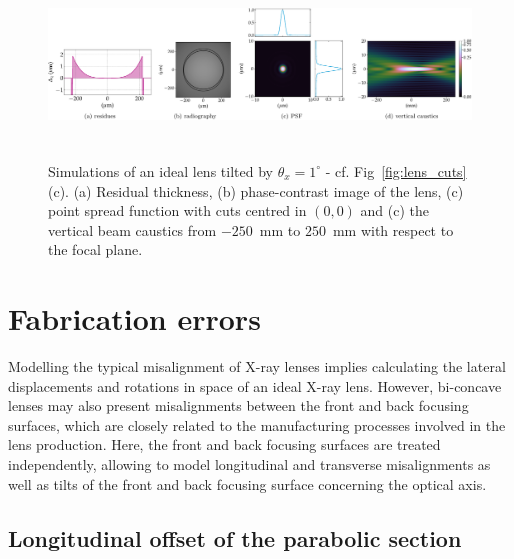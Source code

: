 \begin{refsection}
\begin{figure}[t]
        \centering
        {\includegraphics[height=4.19cm]{figures/compressed/tilted_CRL.pdf}}
        \caption[Effects of a CRL tilt]{Simulations of an ideal lens tilted by $\theta_x=1^{\circ}$ - cf. Fig~\ref{fig:lens_cuts}(c). (a) Residual thickness, (b) phase-contrast image of the lens, (c) point spread function with cuts centred in $(0,0)$ and (c) the vertical beam caustics from $-250$~mm to $250$~mm with respect to the focal plane. } \label{fig:tilted_CRL}
\end{figure}
\section{Fabrication errors}\label{sec:fabrication}

Modelling the typical misalignment of X-ray lenses implies calculating the lateral displacements and rotations in space of an ideal X-ray lens. However, bi-concave lenses may also present misalignments between the front and back focusing surfaces, which are closely related to the manufacturing processes involved in the lens production. Here, the front and back focusing surfaces are treated independently, allowing to model longitudinal and transverse misalignments as well as tilts of the front and back focusing surface concerning the optical axis.

\subsection{Longitudinal offset of the parabolic section}


\end{refsection}
